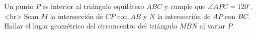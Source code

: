 Un punto $P$ es interior al triángulo equilátero $ABC$ y cumple que $\angle APC = 120^{\circ}$.<br>
Sean $M$ la intersección de $CP$ con $AB$ y $N$ la intersección de $AP$ con $BC$. Hallar el lugar geométrico del circuncentro del triángulo $MBN$ al variar $P$.
